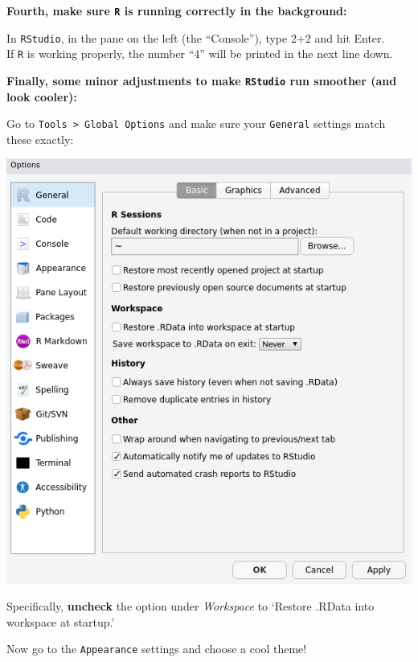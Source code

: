 \documentclass[
]{book}
\begin{document}
\textbf{Fourth, make sure \texttt{R} is running correctly in the background:}

In \texttt{RStudio}, in the pane on the left (the ``Console''), type 2+2 and hit Enter.\\
If \texttt{R} is working properly, the number ``4'' will be printed in the next line down.

\textbf{Finally, some minor adjustments to make \texttt{RStudio} run smoother (and look cooler):}

Go to \texttt{Tools\ \textgreater{}\ Global\ Options} and make sure your \texttt{General} settings match these exactly:

\includegraphics{img/rstudio_settings.png}

Specifically, \textbf{uncheck} the option under \emph{Workspace} to `Restore .RData into workspace at startup.'

Now go to the \texttt{Appearance} settings and choose a cool theme!
\end{document}
